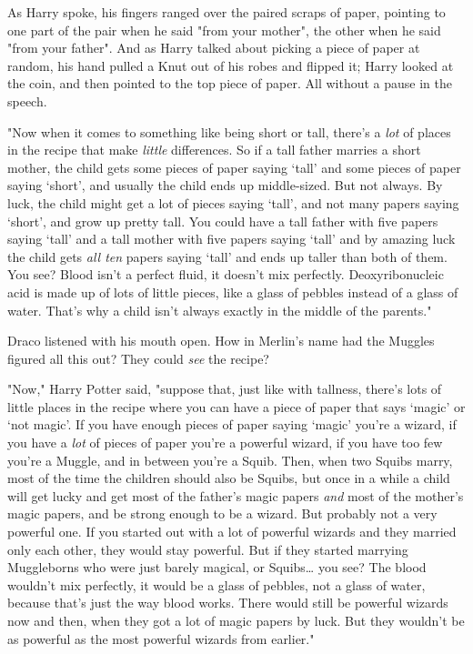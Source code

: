 As Harry spoke, his fingers ranged over the paired scraps of paper, pointing to
one part of the pair when he said "from your mother", the other when he said
"from your father". And as Harry talked about picking a piece of paper at
random, his hand pulled a Knut out of his robes and flipped it; Harry looked at
the coin, and then pointed to the top piece of paper. All without a pause in
the speech.

"Now when it comes to something like being short or tall, there's a \emph{lot}
of places in the recipe that make \emph{little} differences. So if a tall
father marries a short mother, the child gets some pieces of paper saying
`tall' and some pieces of paper saying `short', and usually the child ends up
middle-sized. But not always. By luck, the child might get a lot of pieces
saying `tall', and not many papers saying `short', and grow up pretty tall. You
could have a tall father with five papers saying `tall' and a tall mother with
five papers saying `tall' and by amazing luck the child gets \emph{all ten}
papers saying `tall' and ends up taller than both of them. You see? Blood isn't
a perfect fluid, it doesn't mix perfectly. Deoxyribonucleic acid is made up of
lots of little pieces, like a glass of pebbles instead of a glass of water.
That's why a child isn't always exactly in the middle of the parents."

Draco listened with his mouth open. How in Merlin's name had the Muggles
figured all this out? They could \emph{see} the recipe?

"Now," Harry Potter said, "suppose that, just like with tallness, there's lots
of little places in the recipe where you can have a piece of paper that says
`magic' or `not magic'. If you have enough pieces of paper saying `magic'
you're a wizard, if you have a \emph{lot} of pieces of paper you're a powerful
wizard, if you have too few you're a Muggle, and in between you're a Squib.
Then, when two Squibs marry, most of the time the children should also be
Squibs, but once in a while a child will get lucky and get most of the father's
magic papers \emph{and} most of the mother's magic papers, and be strong enough
to be a wizard. But probably not a very powerful one. If you started out with a
lot of powerful wizards and they married only each other, they would stay
powerful. But if they started marrying Muggleborns who were just barely
magical, or Squibs{\ldots} you see? The blood wouldn't mix perfectly, it would
be a glass of pebbles, not a glass of water, because that's just the way blood
works. There would still be powerful wizards now and then, when they got a lot
of magic papers by luck. But they wouldn't be as powerful as the most powerful
wizards from earlier."

